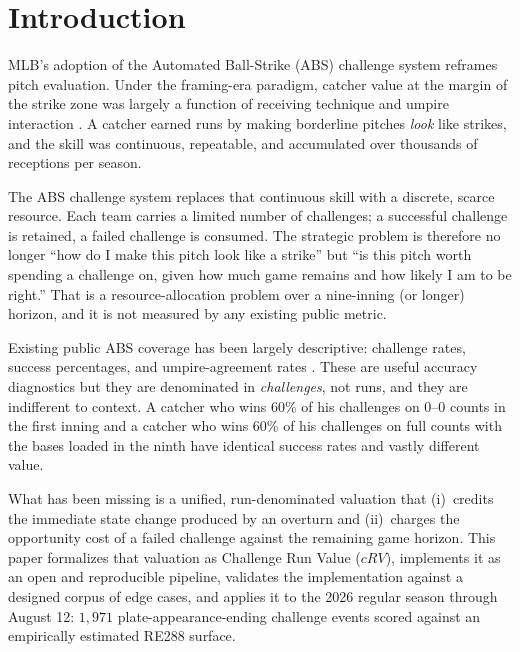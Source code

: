\section{Introduction}
MLB's adoption of the Automated Ball-Strike (ABS) challenge system reframes
pitch evaluation. Under the framing-era paradigm, catcher value at the margin
of the strike zone was largely a function of receiving technique and umpire
interaction \citep{marchi2013,fast2011,mlbframing}. A catcher earned runs by
making borderline pitches \emph{look} like strikes, and the skill was
continuous, repeatable, and accumulated over thousands of receptions per
season.

The ABS challenge system replaces that continuous skill with a discrete,
scarce resource. Each team carries a limited number of challenges; a
successful challenge is retained, a failed challenge is consumed. The
strategic problem is therefore no longer ``how do I make this pitch look like
a strike'' but ``is this pitch worth spending a challenge on, given how much
game remains and how likely I am to be right.'' That is a resource-allocation
problem over a nine-inning (or longer) horizon, and it is not measured by any
existing public metric.

Existing public ABS coverage has been largely descriptive: challenge rates,
success percentages, and umpire-agreement rates \citep{mlbabs2026}. These are
useful accuracy diagnostics but they are denominated in \emph{challenges}, not
runs, and they are indifferent to context. A catcher who wins 60\% of his
challenges on 0--0 counts in the first inning and a catcher who wins 60\% of
his challenges on full counts with the bases loaded in the ninth have
identical success rates and vastly different value.

What has been missing is a unified, run-denominated valuation that (i)~credits
the immediate state change produced by an overturn and (ii)~charges the
opportunity cost of a failed challenge against the remaining game horizon.
This paper formalizes that valuation as Challenge Run Value ($cRV$), implements
it as an open and reproducible pipeline, validates the implementation against a
designed corpus of edge cases, and applies it to the 2026 regular season
through August 12: $1{,}971$ plate-appearance-ending challenge events scored
against an empirically estimated RE288 surface.

